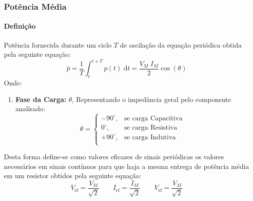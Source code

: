 \documentclass{article}
\begin{document}
            \subsubsection{Potência Média}
                \paragraph{Definição}Potência fornecida durante um ciclo $T$ de oscilação da equação periódica obtida pela seguinte equação:
                    \begin{equation}
                        \bar{p} = 
                        \frac{1}{T} \int_{t}^{t+T} p(t)\;\text{d}t = 
                        \boxed{
                            \frac{V_{M}\;I_{M}}{2} \cos(\theta)
                        }
                    \end{equation}
                Onde:
                    \begin{enumerate}
                        \item \textbf{Fase da Carga:} $\theta$, Representando o impedância geral pelo componente analísado:
                            \begin{equation*}
                                \theta = 
                                \begin{cases}
                                    -90^{\circ}, & \text{se carga Capacitiva}\\
                                      0^{\circ}, & \text{se carga Resistiva}\\
                                    +90^{\circ}, & \text{se carga Indutiva}\\
                                \end{cases}
                            \end{equation*}
                    \end{enumerate}
                Desta forma define-se como valores eficazes de sinais periódicas os valores necessários em sinais contínuos para que haja a mesma entrega de potência média em um resistor obtidos pela seguinte equação:
                    \begin{equation}
                        \boxed{V_{\text{ef}} = \frac{V_{M}}{\sqrt{2}}}
                        \qquad
                        \boxed{I_{\text{ef}} = \frac{I_{M}}{\sqrt{2}}}
                        \qquad
                        \boxed{V_{\text{ef}} = \frac{V_{M}}{\sqrt{2}}}
                    \end{equation}
\end{document}
